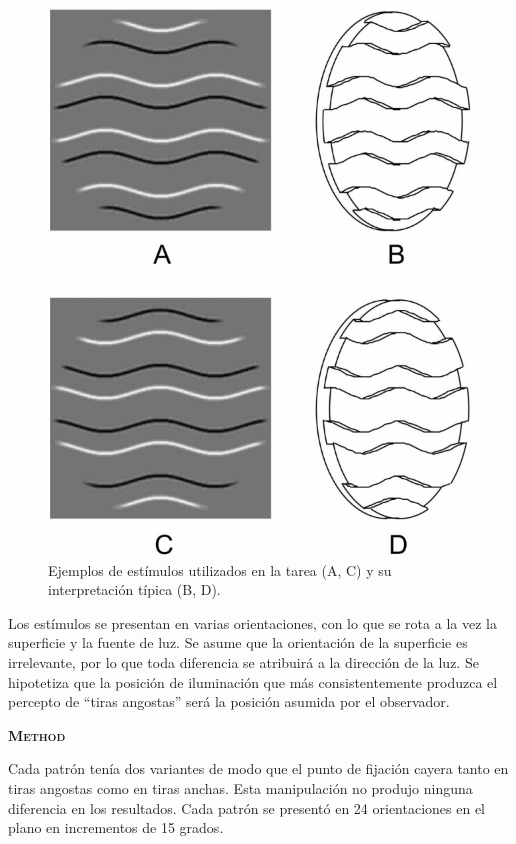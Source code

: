 \documentclass[a4paper,12pt]{article}
\begin{document}
\begin{figure}[ht]
	\begin{center}
		\includegraphics[scale=0.4]{Mamassian2001(1).png}
		\caption{Ejemplos de estímulos utilizados en la tarea (A, C) y su interpretación típica (B, D).}
	\end{center}	
\end{figure}

Los estímulos se presentan en varias orientaciones, con lo que se rota a la vez la superficie y la fuente de luz. Se asume que la orientación de la superficie es irrelevante, por lo que toda diferencia se atribuirá a la dirección de la luz. Se hipotetiza que la posición de iluminación que más consistentemente produzca el percepto de ``tiras angostas'' será la posición asumida por el observador.

{\scshape\bfseries Method}

Cada patrón tenía dos variantes de modo que el punto de fijación cayera tanto en tiras angostas como en tiras anchas. Esta manipulación no produjo ninguna diferencia en los resultados. Cada patrón se presentó en 24 orientaciones en el plano en incrementos de 15 grados.
\end{document}
